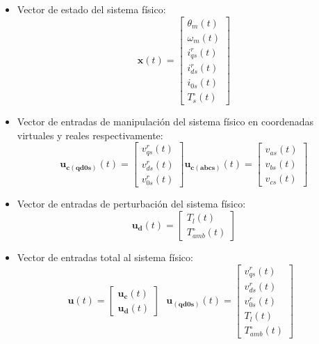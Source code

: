 \documentclass[a4paper, 10pt, onecolumn,journal]{ieeeconf}
\begin{document}
\begin{itemize}
    \item Vector de estado del sistema físico:
    \begin{equation}
        \mathbf{x}(t) = \begin{bmatrix} \theta_m(t) \\ \omega_m(t) \\ i^r_{qs}(t) \\ i^r_{ds}(t) \\ i_{0s}(t) \\ T^{\circ}_s(t) \end{bmatrix}
        \label{vector de estado del sistema}
    \end{equation}
    \item Vector de entradas de manipulación del sistema físico en coordenadas virtuales y reales respectivamente:
    \begin{equation}
        \mathbf{u_{c(qd0s)}}(t) = \begin{bmatrix} v^r_{qs}(t) \\ v^r_{ds}(t) \\ v^r_{0s}(t)\end{bmatrix}
        \mathbf{u_{c(abcs)}}(t) = \begin{bmatrix} v_{as}(t) \\ v_{bs}(t) \\ v_{cs}(t)\end{bmatrix}
        \label{vector de entradas de control}
    \end{equation}
    \item Vector de entradas de perturbación del sistema físico:
    \begin{equation}
        \mathbf{u_{d}}(t) = \begin{bmatrix} T_l(t) \\ T_{amb}^{\circ}(t)\end{bmatrix}
        \label{vector de entradas de perturbacion}
    \end{equation}
    \item Vector de entradas total al sistema físico:
    \begin{equation}
        \mathbf{u}(t) = \begin{bmatrix} \mathbf{u_c}(t) \\ \mathbf{u_d}(t)\end{bmatrix} \, \, \, \,
        \mathbf{u_{(qd0s)}}(t) = \begin{bmatrix} v^r_{qs}(t) \\ v^r_{ds}(t) \\ v^r_{0s}(t) \\ T_l(t) \\ T_{amb}^{\circ}(t) \end{bmatrix}\, \, \, \,

\end{equation}
\end{itemize}
\end{document}
